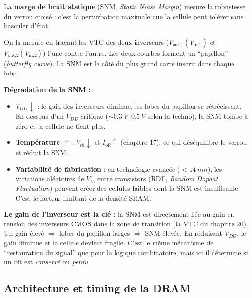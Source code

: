 \documentclass[12pt,a4paper,twoside]{book}
\begin{document}
\begin{formule}
La \textbf{marge de bruit statique} (SNM, \textit{Static Noise Margin}) mesure la robustesse du verrou croisé : c'est la perturbation maximale que la cellule peut tolérer sans basculer d'état.

On la mesure en traçant les VTC des deux inverseurs ($V_{\text{out,1}}(V_{\text{in,1}})$ et $V_{\text{out,2}}(V_{\text{in,2}})$) l'une contre l'autre. Les deux courbes forment un ``papillon'' (\textit{butterfly curve}). La SNM est le côté du plus grand carré inscrit dans chaque lobe.

\textbf{Dégradation de la SNM :}
\begin{itemize}[nosep]
\item \textbf{$V_{DD} \downarrow$} : le gain des inverseurs diminue, les lobes du papillon se rétrécissent. En dessous d'un $V_{DD}$ critique ($\sim \SI{0.3}{V}$--$\SI{0.5}{V}$ selon la techno), la SNM tombe à zéro et la cellule ne tient plus.
\item \textbf{Température $\uparrow$} : $V_{th} \downarrow$ et $I_{\text{off}} \uparrow$ (chapitre 17), ce qui déséquilibre le verrou et réduit la SNM.
\item \textbf{Variabilité de fabrication} : en technologie avancée ($< \SI{14}{nm}$), les variations aléatoires de $V_{th}$ entre transistors (RDF, \textit{Random Dopant Fluctuation}) peuvent créer des cellules faibles dont la SNM est insuffisante. C'est le facteur limitant de la densité SRAM.
\end{itemize}
\end{formule}

\begin{intuition}
\textbf{Le gain de l'inverseur est la clé :} la SNM est directement liée au gain en tension des inverseurs CMOS dans la zone de transition (la VTC du chapitre 20). Un gain élevé $\Rightarrow$ lobes du papillon larges $\Rightarrow$ SNM élevée. En réduisant $V_{DD}$, le gain diminue et la cellule devient fragile. C'est le même mécanisme de ``restauration du signal'' que pour la logique combinatoire, mais ici il détermine si un bit est \textit{conservé} ou \textit{perdu}.
\end{intuition}

\subsection{Architecture et timing de la DRAM}
\end{document}

